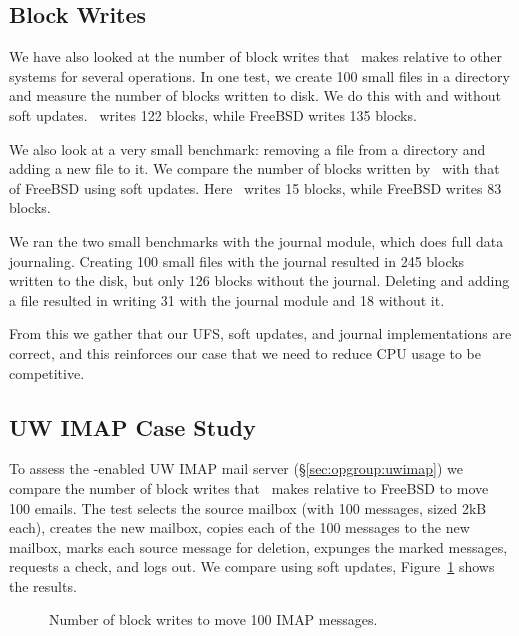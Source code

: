 \subsection {Block Writes}
We have also looked at the number of block writes that \Kudos\ makes
relative to other systems for several operations. In one test, we
create 100 small files in a directory and measure the number of blocks
written to disk. We do this with and without soft updates. \Kudos\
writes 122 blocks, while FreeBSD writes 135 blocks.

We also look at a very small benchmark: removing a file from a
directory and adding a new file to it. We compare the number of blocks
written by \Kudos\ with that of FreeBSD using soft updates. Here
\Kudos\ writes 15 blocks, while FreeBSD writes 83 blocks.

We ran the two small benchmarks with the journal module, which does
full data journaling. Creating 100 small files with the journal
resulted in 245 blocks written to the disk, but only 126 blocks
without the journal. Deleting and adding a file resulted in writing
31 with the journal module and 18 without it.

From this we gather that our UFS, soft updates, and journal
implementations are correct, and this reinforces our case that we need
to reduce CPU usage to be competitive.

\subsection {UW IMAP Case Study}
\label{sec:evaluation:uwimap}
To assess the \opgroup-enabled UW IMAP mail server
(\S\ref{sec:opgroup:uwimap}) we compare the number of block writes
that \Kudos\ makes relative to FreeBSD to move 100 emails. The test
selects the source mailbox (with 100 messages, sized 2kB each),
creates the new mailbox, copies each of the 100 messages to the new
mailbox, marks each source message for deletion, expunges the marked
messages, requests a check, and logs out. We compare using soft updates,
Figure~\ref{fig:imap-compare} shows the results.

\begin{figure}[htb]
\caption{\label{fig:imap-compare} Number of block writes to move 100
  IMAP messages.}
\end{figure}
